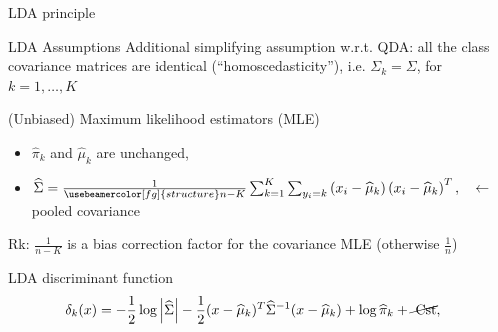 \documentclass[compress, smaller, serif, 9pt]{beamer}
\newcommand{\structuretext}[1]{{\usebeamercolor[fg]{structure} #1}}
\begin{document}
\begin{frame}{LDA principle}

\begin{block}{LDA Assumptions}
Additional simplifying assumption w.r.t. QDA: all the class covariance matrices are identical (``homoscedasticity''), i.e. \structuretext{$\Sigma_k= \Sigma$}, for $k=1,\ldots,K$
\end{block}\medskip

\begin{block}{(Unbiased) Maximum likelihood estimators (MLE)}
\begin{itemize}
 \item $\widehat{\pi}_k$ and $\widehat{\mu}_k$ are unchanged,
 \item $\widehat{\Sigma} = \frac{1}{\structuretext{n-K}} \sum_{k=1}^K \sum_{y_i=k} \left(x_i-\widehat{\mu}_k \right) \left(x_i-\widehat{\mu}_k \right)^T,
 \quad \leftarrow $ pooled  covariance
\end{itemize}
Rk:  $\frac{1}{n-K}$ is a bias correction factor for the covariance MLE (otherwise $\frac{1}{n}$)
\end{block}\medskip

\begin{block}{LDA discriminant function}
\begin{align*}
 \delta_k(x)&= -\frac{1}{2} \log\left|\widehat{\Sigma}\right| - \frac{1}{2}
 (x-\widehat{\mu}_k)^T \widehat{\Sigma}^{-1} (x-\widehat{\mu}_k)+ \log \widehat{\pi}_k + \cancel{ \textrm{ Cst} },
\end{align*}
\end{block}
\end{frame}
\end{document}
